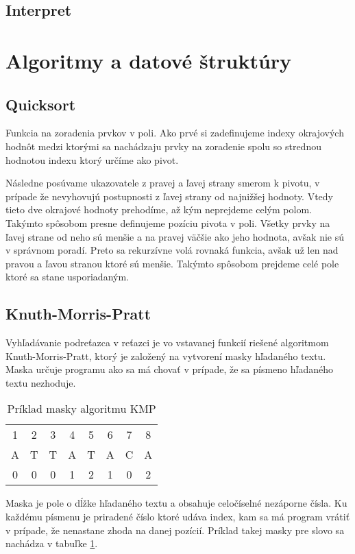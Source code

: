 \documentclass[12pt,a4paper,titlepage,final]{article}
\begin{document}
\subsection{Interpret}
\section{Algoritmy a datové štruktúry}
\subsection{Quicksort}
Funkcia na zoradenia prvkov v poli. Ako prvé si zadefinujeme indexy okrajových
hodnôt medzi ktorými sa nachádzaju prvky na zoradenie spolu so strednou hodnotou
indexu ktorý určíme ako pivot.

Následne posúvame ukazovatele  z pravej a ľavej strany smerom k pivotu,
 v prípade že nevyhovujú postupnosti z ľavej strany od najnižšej hodnoty.
Vtedy tieto dve okrajové hodnoty prehodíme, až kým neprejdeme celým polom.
Takýmto spôsobom presne definujeme pozíciu pivota v poli. Všetky prvky na ľavej
 strane od neho sú menšie a na pravej väčšie ako jeho hodnota, avšak nie sú
 v správnom poradí. Preto sa rekurzívne volá rovnaká funkcia, avšak už len nad
 pravou a ľavou stranou ktoré sú menšie. Takýmto spôsobom prejdeme celé pole
 ktoré sa stane usporiadaným.

\subsection{Knuth-Morris-Pratt}
Vyhľadávanie podreťazca v reťazci je vo vstavanej funkcií riešené algoritmom
 Knuth-Morris-Pratt, ktorý je založený na vytvorení masky hľadaného textu.
Maska určuje programu ako sa má chovať v prípade, že sa písmeno hľadaného
 textu nezhoduje.
\begin{table}[H]
 \centering
 \begin{tabular}{cccccccc}
 	1 & 2 & 3 & 4 & 5 & 6 & 7 & 8 \\
 	A & T & T & A & T & A & C & A \\
 	0 & 0 & 0 & 1 & 2 & 1 & 0 & 2
 \end{tabular}
 \caption{Príklad masky algoritmu KMP}
 \label{tab:kmp}
\end{table}

Maska je pole o dĺžke hľadaného textu a obsahuje celočíselné nezáporne čísla.
Ku každému písmenu je priradené číslo ktoré udáva index, kam sa má program
 vrátiť v prípade, že nenastane zhoda na danej pozícií. Príklad takej masky
 pre slovo  sa nachádza v tabuľke \ref{tab:kmp}.
\end{document}
